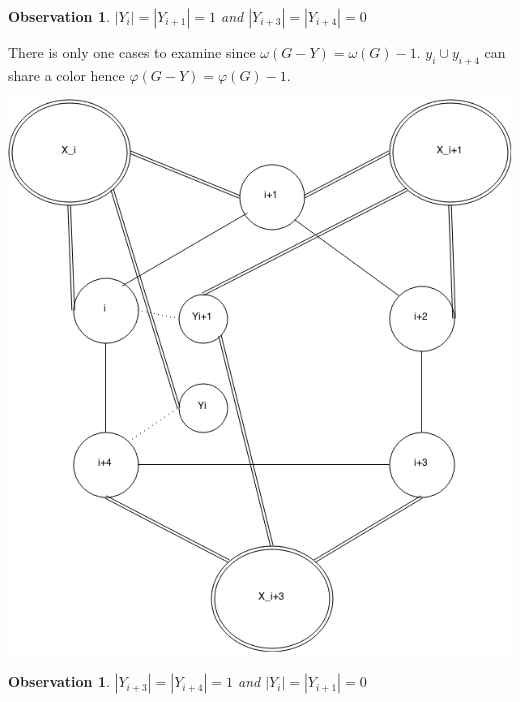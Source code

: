 \documentclass[12pt]{article}
\newtheorem{Observation}[Theorem]{Observation}
\begin{document}
\begin{Observation}\label{obs:yi-yi1}
$|Y_{i}| = |Y_{i+1}| = 1$ and $|Y_{i+3}| = |Y_{i+4}| = 0$
\end{Observation}

\begin{minipage}{0.5\textwidth}%
	 There is only one cases to examine since $\omega(G - Y) = \omega(G) - 1 $. $y_{i} \cup y_{i+4}$ can share a color hence $\varphi(G - Y) = \varphi(G) - 1$.
\end{minipage}
\hfill
\begin{minipage}{0.5\textwidth}\raggedleft
	\includegraphics[width=\linewidth]{Yi-Yi1.png}
\end{minipage}



\begin{Observation}\label{obs:yi3-yi4}
$|Y_{i+3}| = |Y_{i+4}| = 1$ and $|Y_{i}| = |Y_{i+1}| = 0$
\end{Observation}
\end{document}
